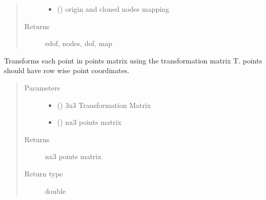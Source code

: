 \documentclass[letterpaper,10pt,english]{sphinxmanual}
\begin{document}
\begin{fulllineitems}
\begin{quote}
\begin{description}
\begin{itemize}
\item {} 
 () \textendash{} origin and cloned nodes mapping

\end{itemize}

\item[{Returns}] \leavevmode
edof, nodes, dof, map

\end{description}\end{quote}

\end{fulllineitems}


\begin{fulllineitems}
\label{\detokenize{api:beamon.core.transform}}
Transforms each point in points matrix using the transformation matrix T.
points should have row wise point coordinates.
\begin{quote}\begin{description}
\item[{Parameters}] \leavevmode\begin{itemize}
\item {} 
 () \textendash{} 3x3 Transformation Matrix

\item {} 
 () \textendash{} nx3 points matrix

\end{itemize}

\item[{Returns}] \leavevmode
nx3 points matrix

\item[{Return type}] \leavevmode
double

\end{description}\end{quote}

\end{fulllineitems}
\end{document}
